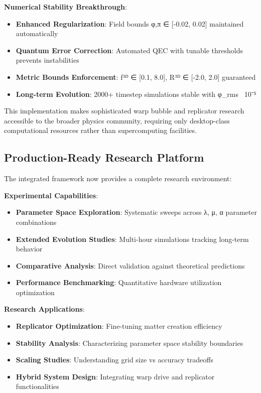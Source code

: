 \textbf{Numerical Stability Breakthrough}:
\begin{itemize}
\item \textbf{Enhanced Regularization}: Field bounds φ,π ∈ [-0.02, 0.02] maintained automatically
\item \textbf{Quantum Error Correction}: Automated QEC with tunable thresholds prevents instabilities
\item \textbf{Metric Bounds Enforcement}: f³ᴰ ∈ [0.1, 8.0], R³ᴰ ∈ [-2.0, 2.0] guaranteed
\item \textbf{Long-term Evolution}: 2000+ timestep simulations stable with φ_rms ~10⁻⁵
\end{itemize}

This implementation makes sophisticated warp bubble and replicator research accessible to the broader physics community, requiring only desktop-class computational resources rather than supercomputing facilities.

\subsection{Production-Ready Research Platform}

The integrated framework now provides a complete research environment:

\textbf{Experimental Capabilities}:
\begin{itemize}
\item \textbf{Parameter Space Exploration}: Systematic sweeps across λ, μ, α parameter combinations
\item \textbf{Extended Evolution Studies}: Multi-hour simulations tracking long-term behavior
\item \textbf{Comparative Analysis}: Direct validation against theoretical predictions
\item \textbf{Performance Benchmarking}: Quantitative hardware utilization optimization
\end{itemize}

\textbf{Research Applications}:
\begin{itemize}
\item \textbf{Replicator Optimization}: Fine-tuning matter creation efficiency
\item \textbf{Stability Analysis}: Characterizing parameter space stability boundaries  
\item \textbf{Scaling Studies}: Understanding grid size vs accuracy tradeoffs
\item \textbf{Hybrid System Design}: Integrating warp drive and replicator functionalities
\end{itemize}

